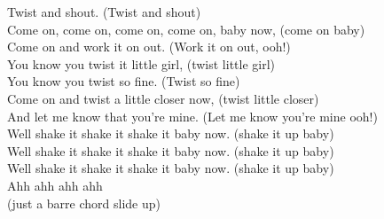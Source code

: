 Twist and shout. (Twist and shout)\\
Come on, come on, come on, come on, baby now, (come on baby)\\
Come on and work it on out. (Work it on out, ooh!)\\
You know you twist it little girl, (twist little girl)\\
You know you twist so fine. (Twist so fine)\\
Come on and twist a little closer now, (twist little closer)\\
And let me know that you’re mine. (Let me know you’re mine ooh!)\\

Well shake it shake it shake it baby now. (shake it up baby)\\
Well shake it shake it shake it baby now. (shake it up baby)\\
Well shake it shake it shake it baby now. (shake it up baby)\\

  Ahh ahh ahh ahh       \\

(just a barre chord slide up)\\
